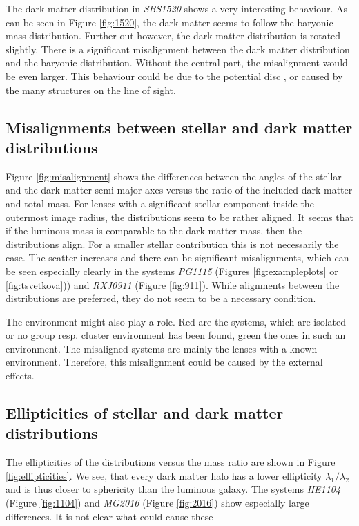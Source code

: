 \documentclass[10pt]{article}
\begin{document}
The dark matter distribution in \textit{SBS1520} shows a very interesting behaviour. As can be seen in Figure \ref{fig:1520}, the dark matter seems to follow the baryonic mass distribution. Further out however, the dark matter distribution is rotated slightly. There is a significant misalignment between the dark matter distribution and the baryonic distribution. Without the central part, the misalignment would be even larger. This behaviour could be due to the potential disc \cite{2008ApJ...673..778A}, or caused by the many structures on the line of sight.


\subsection{Misalignments between stellar and dark matter distributions}
Figure \ref{fig:misalignment} shows the differences between the angles of the stellar and the dark matter semi-major axes versus the ratio of the included dark matter and total mass. For lenses with a significant stellar component inside the outermost image radius, the distributions seem to be rather aligned. It seems that if the luminous mass is comparable to the dark matter mass, then the distributions align. For a smaller stellar contribution this is not necessarily the case. The scatter increases and there can be significant misalignments, which can be seen especially clearly in the systems \textit{PG1115} (Figures \ref{fig:exampleplots} or \ref{fig:tsvetkova})) and \textit{RXJ0911} (Figure \ref{fig:911}). While alignments between the distributions are preferred, they do not seem to be a necessary condition.

The environment might also play a role. Red are the systems, which are isolated or no group resp. cluster environment has been found, green the ones in such an environment. The misaligned systems are mainly the lenses with a known environment. Therefore, this misalignment could be caused by the external effects.


\subsection{Ellipticities of stellar and dark matter distributions}
The ellipticities of the distributions versus the mass ratio are shown in Figure \ref{fig:ellipticities}. We see, that every dark matter halo has a lower ellipticity $\lambda_{1}/\lambda_{2}$ and is thus closer to sphericity than the luminous galaxy. The systems \textit{HE1104} (Figure \ref{fig:1104}) and \textit{MG2016} (Figure \ref{fig:2016}) show especially large differences. It is not clear what could cause these
\end{document}
